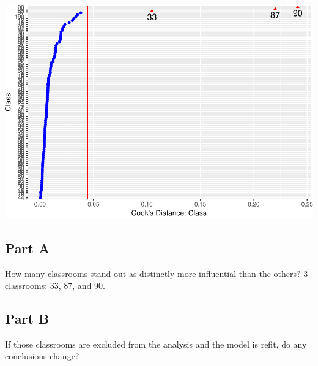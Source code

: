 \documentclass[]{article}
\begin{document}
\includegraphics{Beck_HW_5_files/figure-latex/unnamed-chunk-21-1.pdf}

\subsection{Part A}\label{part-a-5}

How many classrooms stand out as distinctly more influential than the
others? 3 classrooms: 33, 87, and 90.

\subsection{Part B}\label{part-b-5}

If those classrooms are excluded from the analysis and the model is
refit, do any conclusions change?
\end{document}
